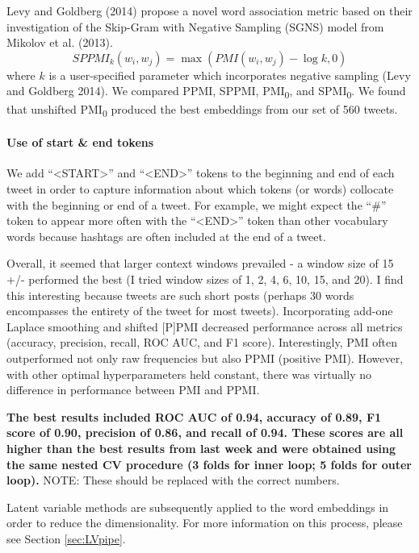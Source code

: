 \documentclass{article}
\begin{document}
Levy and Goldberg (2014) propose a novel word association metric based
on their investigation of the Skip-Gram with Negative Sampling (SGNS)
model from Mikolov et al. (2013).
\[SPPMI_k(w_i, w_j) = \max(PMI(w_i, w_j) - \log k, 0)\] where \(k\) is a
user-specified parameter which incorporates negative sampling (Levy and
Goldberg 2014). We compared PPMI, SPPMI, PMI\textsubscript{0}, and
SPMI\textsubscript{0}. We found that unshifted PMI\textsubscript{0}
produced the best embeddings from our set of 560 tweets.

\hypertarget{use-of-start-end-tokens}{%
\paragraph{Use of start \& end tokens}\label{use-of-start-end-tokens}}

We add ``\textless START\textgreater{}'' and
``\textless END\textgreater{}'' tokens to the beginning and end of each
tweet in order to capture information about which tokens (or words)
collocate with the beginning or end of a tweet. For example, we might
expect the ``\#'' token to appear more often with the
``\textless END\textgreater{}'' token than other vocabulary words
because hashtags are often included at the end of a tweet.

Overall, it seemed that larger context windows prevailed - a window size
of 15 +/- performed the best (I tried window sizes of 1, 2, 4, 6, 10,
15, and 20). I find this interesting because tweets are such short posts
(perhaps 30 words encompasses the entirety of the tweet for most
tweets). Incorporating add-one Laplace smoothing and shifted {[}P{]}PMI
decreased performance across all metrics (accuracy, precision, recall,
ROC AUC, and F1 score). Interestingly, PMI often outperformed not only
raw frequencies but also PPMI (positive PMI). However, with other
optimal hyperparameters held constant, there was virtually no difference
in performance between PMI and PPMI.

\textbf{The best results included ROC AUC of 0.94, accuracy of 0.89, F1
score of 0.90, precision of 0.86, and recall of 0.94. These scores are
all higher than the best results from last week and were obtained using
the same nested CV procedure (3 folds for inner loop; 5 folds for outer
loop).} NOTE: These should be replaced with the correct numbers.

Latent variable methods are subsequently applied to the word embeddings
in order to reduce the dimensionality. For more information on this
process, please see Section \ref{sec:LVpipe}.
\end{document}
